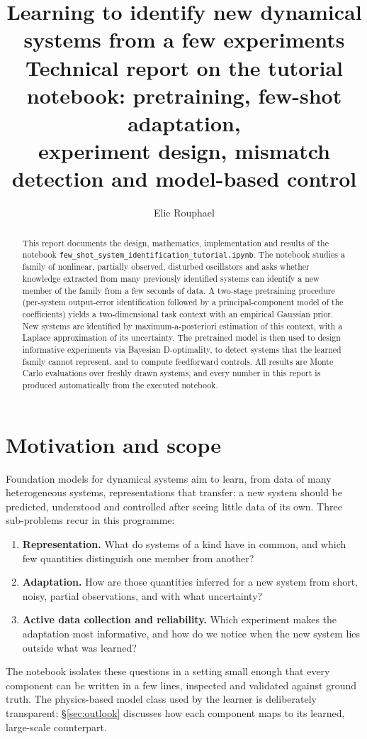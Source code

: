 \documentclass[11pt,a4paper]{article}
\title{\textbf{Learning to identify new dynamical systems from a few experiments}\\[4pt]
\large Technical report on the tutorial notebook: pretraining, few-shot adaptation,\\
experiment design, mismatch detection and model-based control}
\author{Elie Rouphael}
\date{}
\begin{document}
\maketitle

\begin{abstract}
\noindent
This report documents the design, mathematics, implementation and results of the notebook
\texttt{few\_shot\_system\_identification\_tutorial.ipynb}. The notebook studies a family of
nonlinear, partially observed, disturbed oscillators and asks whether knowledge extracted from
many previously identified systems can identify a new member of the family from a few seconds of
data. A two-stage pretraining procedure (per-system output-error identification followed by a
principal-component model of the coefficients) yields a two-dimensional task context with an
empirical Gaussian prior. New systems are identified by maximum-a-posteriori estimation of this
context, with a Laplace approximation of its uncertainty. The pretrained model is then used to
design informative experiments via Bayesian D-optimality, to detect systems that the learned family
cannot represent, and to compute feedforward controls. All results are Monte Carlo evaluations over
freshly drawn systems, and every number in this report is produced automatically from the executed
notebook.
\end{abstract}

\tableofcontents
\newpage

\section{Motivation and scope}

Foundation models for dynamical systems aim to learn, from data of many heterogeneous systems,
representations that transfer: a new system should be predicted, understood and controlled after
seeing little data of its own. Three sub-problems recur in this programme:
\begin{enumerate}
  \item \textbf{Representation.} What do systems of a kind have in common, and which few quantities
        distinguish one member from another?
  \item \textbf{Adaptation.} How are those quantities inferred for a new system from short, noisy,
        partial observations, and with what uncertainty?
  \item \textbf{Active data collection and reliability.} Which experiment makes the adaptation most
        informative, and how do we notice when the new system lies outside what was learned?
\end{enumerate}
The notebook isolates these questions in a setting small enough that every component can be
written in a few lines, inspected and validated against ground truth. The physics-based model class
used by the learner is deliberately transparent; \S\ref{sec:outlook} discusses how each component
maps to its learned, large-scale counterpart.
\end{document}

